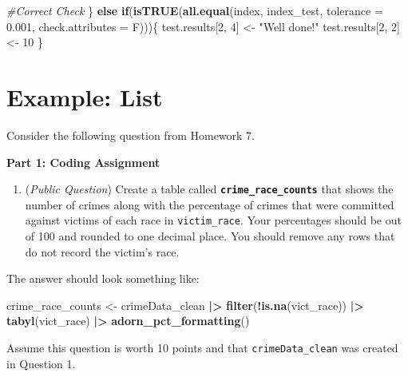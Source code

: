 \documentclass[
  12pt,
]{book}
\newenvironment{Shaded}{\begin{snugshade}}{\end{snugshade}}
\newcommand{\AttributeTok}[1]{\textcolor[rgb]{0.13,0.29,0.53}{#1}}
\newcommand{\CommentTok}[1]{\textcolor[rgb]{0.56,0.35,0.01}{\textit{#1}}}
\newcommand{\ControlFlowTok}[1]{\textcolor[rgb]{0.13,0.29,0.53}{\textbf{#1}}}
\newcommand{\DecValTok}[1]{\textcolor[rgb]{0.00,0.00,0.81}{#1}}
\newcommand{\FloatTok}[1]{\textcolor[rgb]{0.00,0.00,0.81}{#1}}
\newcommand{\FunctionTok}[1]{\textcolor[rgb]{0.13,0.29,0.53}{\textbf{#1}}}
\newcommand{\NormalTok}[1]{#1}
\newcommand{\OtherTok}[1]{\textcolor[rgb]{0.56,0.35,0.01}{#1}}
\newcommand{\SpecialCharTok}[1]{\textcolor[rgb]{0.81,0.36,0.00}{\textbf{#1}}}
\newcommand{\StringTok}[1]{\textcolor[rgb]{0.31,0.60,0.02}{#1}}
\providecommand{\tightlist}{%
  \setlength{\itemsep}{0pt}\setlength{\parskip}{0pt}}
\begin{document}
\begin{Shaded}
\begin{Highlighting}[]
\CommentTok{\#Correct Check}
\NormalTok{\} }\ControlFlowTok{else} \ControlFlowTok{if}\NormalTok{(}\FunctionTok{isTRUE}\NormalTok{(}\FunctionTok{all.equal}\NormalTok{(index, index\_test, }
                           \AttributeTok{tolerance =} \FloatTok{0.001}\NormalTok{, }\AttributeTok{check.attributes =}\NormalTok{ F)))\{ }
\NormalTok{  test.results[}\DecValTok{2}\NormalTok{, }\DecValTok{4}\NormalTok{] }\OtherTok{\textless{}{-}} \StringTok{"Well done!"}
\NormalTok{  test.results[}\DecValTok{2}\NormalTok{, }\DecValTok{2}\NormalTok{] }\OtherTok{\textless{}{-}} \DecValTok{10}
\NormalTok{\}}
\end{Highlighting}
\end{Shaded}

\section{Example: List}\label{example-list}

Consider the following question from Homework 7.

\textbf{Part 1: Coding Assignment}

\begin{enumerate}
\def\labelenumi{\arabic{enumi}.}
\setcounter{enumi}{2}
\tightlist
\item
  (\emph{Public Question}) Create a table called \textbf{\texttt{crime\_race\_counts}} that shows the number of crimes along with the percentage of crimes that were committed against victims of each race in \texttt{victim\_race}. Your percentages should be out of 100 and rounded to one decimal place. You should remove any rows that do not record the victim's race.
\end{enumerate}

The answer should look something like:

\begin{Shaded}
\begin{Highlighting}[]
\NormalTok{crime\_race\_counts }\OtherTok{\textless{}{-}}\NormalTok{ crimeData\_clean }\SpecialCharTok{|\textgreater{}} 
  \FunctionTok{filter}\NormalTok{(}\SpecialCharTok{!}\FunctionTok{is.na}\NormalTok{(vict\_race)) }\SpecialCharTok{|\textgreater{}} 
  \FunctionTok{tabyl}\NormalTok{(vict\_race) }\SpecialCharTok{|\textgreater{}}
  \FunctionTok{adorn\_pct\_formatting}\NormalTok{()}
\end{Highlighting}
\end{Shaded}

Assume this question is worth 10 points and that \texttt{crimeData\_clean} was created in Question 1.
\end{document}
